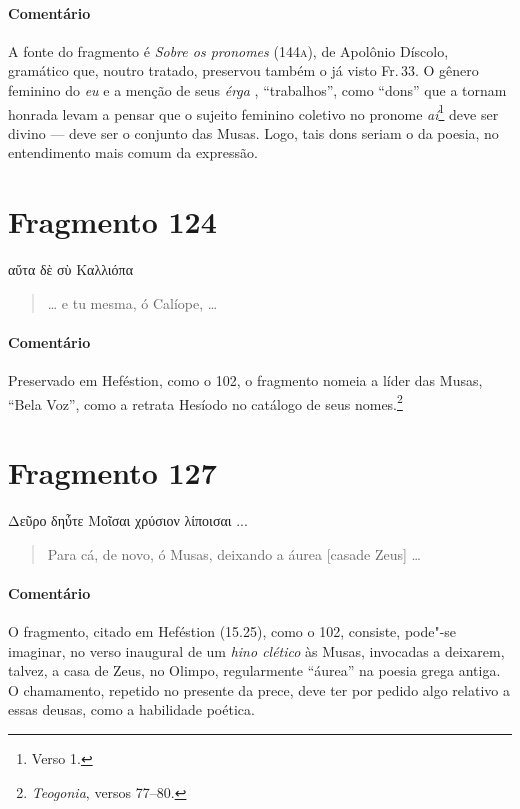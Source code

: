 \medskip

{\paragraph{Comentário} A fonte do fragmento é \emph{Sobre os pronomes} (144\textsc{a}), de Apolônio
Díscolo, gramático que, noutro tratado, preservou também o já visto Fr.\,33. O
gênero feminino do \emph{eu} e a menção de seus \emph{érga }, ``trabalhos'', como
``dons'' que a tornam honrada levam a pensar que o sujeito feminino
coletivo no pronome \emph{aí}\footnote{Verso 1.} deve ser divino --- deve ser o conjunto das Musas. Logo, tais dons
seriam o da poesia, no entendimento mais comum da expressão.}


\section{Fragmento 124}

\begin{gkverse}
αὔτα δὲ σὺ Καλλιόπα
\end{gkverse}

\begin{verse}
\ldots{} e tu mesma, ó Calíope, \ldots{}
\end{verse}

\medskip

{\paragraph{Comentário} Preservado em Heféstion, como o 102, o fragmento nomeia a líder das Musas, ``Bela Voz'', como a retrata Hesíodo no catálogo de seus nomes.\footnote{\emph{Teogonia}, versos 77--80.}}


\section{Fragmento 127}

\begin{gkverse}
Δεῦρο δηὖτε Μοῖσαι χρύσιον λίποισαι ...
\end{gkverse}

\begin{verse}
Para cá, de novo, ó Musas, deixando a áurea {[}casa\qb{}de Zeus{]} \ldots{}
\end{verse}

\medskip

{\paragraph{Comentário} O fragmento, citado em Heféstion (15.25), como o 102, consiste, pode"-se imaginar, no
verso inaugural de um \emph{hino clético }às Musas, invocadas a deixarem,
talvez, a casa de Zeus, no Olimpo, regularmente ``áurea''
na poesia grega antiga. O chamamento, repetido no presente da prece, deve ter
por pedido algo relativo a essas deusas, como a habilidade poética.}


